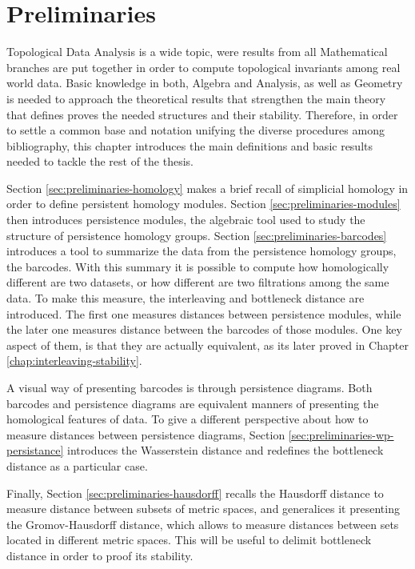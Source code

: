 \chapter{Preliminaries}

Topological Data Analysis is a wide topic, were results from all Mathematical branches are put together in order to compute topological invariants among real world data. Basic knowledge in both, Algebra and Analysis, as well as Geometry is needed to approach the theoretical results that strengthen the main theory that defines proves the needed structures and their stability. Therefore, in order to settle a common base and notation unifying the diverse procedures among bibliography, this chapter introduces the main definitions and basic results needed to tackle the rest of the thesis.

Section \ref{sec:preliminaries-homology} makes a 
brief recall of simplicial homology in order to define persistent homology modules. Section \ref{sec:preliminaries-modules} then introduces persistence modules, the algebraic tool used to study the structure of persistence homology groups. Section \ref{sec:preliminaries-barcodes} introduces a tool to summarize the data from the persistence homology groups, the barcodes. With this summary it is possible to compute how homologically different are two datasets, or how different are two filtrations among the same data. To make this measure, the interleaving and bottleneck distance are introduced. The first one measures distances between persistence modules, while the later one measures distance between the barcodes of those modules. One key aspect of them, is that they are actually equivalent, as its later proved in Chapter \ref{chap:interleaving-stability}.

A visual way of presenting barcodes is through persistence diagrams. Both barcodes and persistence diagrams are equivalent manners of presenting the homological features of data. To give a different perspective about how to measure distances between persistence diagrams, Section \ref{sec:preliminaries-wp-persistance} introduces the Wasserstein distance and redefines the bottleneck distance as a particular case.

Finally, Section \ref{sec:preliminaries-hausdorff} recalls the Hausdorff distance to measure distance between subsets of metric spaces, and generalices it presenting the Gromov-Hausdorff distance, which allows to measure distances between sets located in different metric spaces. This will be useful to delimit bottleneck distance in order to proof its stability.


